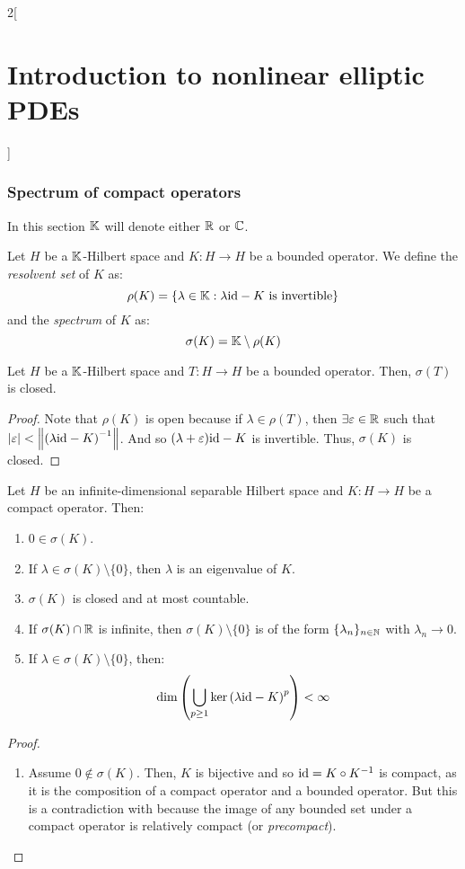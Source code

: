 \documentclass[../../../main_math.tex]{subfiles}
\begin{document}
\begin{multicols}{2}[\section{Introduction to nonlinear elliptic PDEs}]
  \subsubsection{Spectrum of compact operators}
  In this section $\mathbb{K}$ will denote either $\mathbb{R}$ or $\mathbb{C}$.
  \begin{definition}
    Let $H$ be a $\mathbb{K}$-Hilbert space and $K:H\to H$ be a bounded operator. We define the \emph{resolvent set} of $K$ as:
    $$
      \rho(K)=\{\lambda\in \mathbb{K}: \lambda\mathrm{id}-K \text{ is invertible}\}
    $$
    and the \emph{spectrum} of $K$ as:
    $$
      \sigma(K)=\mathbb{K}\setminus \rho(K)
    $$
  \end{definition}
  \begin{proposition}
    Let $H$ be a $\mathbb{K}$-Hilbert space and $T:H\to H$ be a bounded operator. Then, $\sigma(T)$ is closed.
  \end{proposition}
  \begin{proof}
    Note that $\rho(K)$ is open because if $\lambda\in \rho(T)$, then $\exists\varepsilon\in\mathbb{R}$ such that $\abs{\varepsilon} < \left\|{(\lambda\mathrm{id}-K)}^{-1}\right\|$. And so $(\lambda+\varepsilon)\mathrm{id}-K$ is invertible. Thus, $\sigma(K)$ is closed.
  \end{proof}
  \begin{theorem}
    Let $H$ be an infinite-dimensional separable Hilbert space and $K:H\to H$ be a compact operator. Then:
    \begin{enumerate}
      \item $0\in \sigma(K)$.
            \item\label{INEPDE:item2_spectrum} If $\lambda\in \sigma(K)\setminus\{0\}$, then $\lambda$ is an eigenvalue of $K$.
      \item $\sigma(K)$ is closed and at most countable.
      \item If $\sigma(K)\cap\mathbb{R}$ is infinite, then $\sigma(K)\setminus\{0\}$ is of the form $\{\lambda_n\}_{n\in \mathbb{N}}$ with $\lambda_n\to 0$.
      \item If $\lambda\in \sigma(K)\setminus\{0\}$, then:
            $$
              \dim\left(\bigcup_{p\geq 1}\ker{(\lambda\mathrm{id}-K)}^p\right)<\infty
            $$
    \end{enumerate}
  \end{theorem}
  \begin{proof}
    \begin{enumerate}
      \item Assume $0\notin \sigma(K)$. Then, $K$ is bijective and so $\mathrm{id} = K\circ K^{-1}$ is compact, as it is the composition of a compact operator and a bounded operator. But this is a contradiction with  because the image of any bounded set under a compact operator is relatively compact (or \emph{precompact}).

\end{enumerate}
\end{proof}
\end{multicols}
\end{document}
